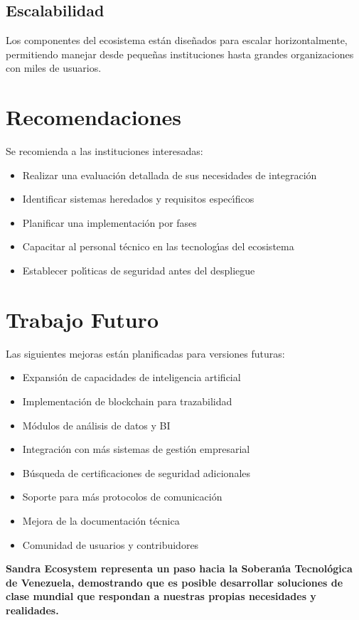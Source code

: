 \subsection{Escalabilidad}
Los componentes del ecosistema est\'an dise\~nados para escalar horizontalmente, permitiendo manejar desde pequeñas instituciones hasta grandes organizaciones con miles de usuarios.

\section{Recomendaciones}

Se recomienda a las instituciones interesadas:

\begin{itemize}
\item Realizar una evaluaci\'on detallada de sus necesidades de integraci\'on
\item Identificar sistemas heredados y requisitos espec\'{\i}ficos
\item Planificar una implementaci\'on por fases
\item Capacitar al personal t\'ecnico en las tecnolog\'{\i}as del ecosistema
\item Establecer pol\'{\i}ticas de seguridad antes del despliegue
\end{itemize}

\section{Trabajo Futuro}

Las siguientes mejoras est\'an planificadas para versiones futuras:

\begin{itemize}
\item Expansi\'on de capacidades de inteligencia artificial
\item Implementaci\'on de blockchain para trazabilidad
\item M\'odulos de an\'alisis de datos y BI
\item Integraci\'on con m\'as sistemas de gesti\'on empresarial
\item B\'usqueda de certificaciones de seguridad adicionales
\item Soporte para m\'as protocolos de comunicaci\'on
\item Mejora de la documentaci\'on t\'ecnica
\item Comunidad de usuarios y contribuidores
\end{itemize}

\vspace{2cm}

\begin{center}
\textbf{Sandra Ecosystem representa un paso hacia la Soberan\'{\i}a Tecnol\'ogica de Venezuela, demostrando que es posible desarrollar soluciones de clase mundial que respondan a nuestras propias necesidades y realidades.}
\end{center}

\newpage

